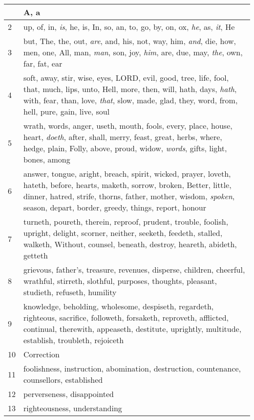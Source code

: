 \begin{center}
\begin{longtable}{l|p{3.75in}}
\hline \hline 
\endlastfoot 
1 & A, a\\ \hline 
2 & up, of, in, \emph{is}, he, is, In, so, an, to, go, by, on, ox, \emph{he}, as, \emph{it}, He\\ \hline 
3 & but, The, the, out, \emph{are}, and, his, not, way, him, \emph{and}, die, how, men, one, All, man, \emph{man}, son, joy, \emph{him}, are, due, may, \emph{the}, own, far, fat, ear\\ \hline 
4 & soft, away, stir, wise, eyes, LORD, evil, good, tree, life, fool, that, much, lips, unto, Hell, more, then, will, hath, days, \emph{hath}, with, fear, than, love, \emph{that}, slow, made, glad, they, word, from, hell, pure, gain, live, soul\\ \hline 
5 & wrath, words, anger, useth, mouth, fools, every, place, house, heart, \emph{doeth}, after, shall, merry, feast, great, herbs, where, hedge, plain, Folly, above, proud, widow, \emph{words}, gifts, light, bones, among\\ \hline 
6 & answer, tongue, aright, breach, spirit, wicked, prayer, loveth, hateth, before, hearts, maketh, sorrow, broken, Better, little, dinner, hatred, strife, thorns, father, mother, wisdom, \emph{spoken}, season, depart, border, greedy, things, report, honour\\ \hline 
7 & turneth, poureth, therein, reproof, prudent, trouble, foolish, upright, delight, scorner, neither, seeketh, feedeth, stalled, walketh, Without, counsel, beneath, destroy, heareth, abideth, getteth\\ \hline 
8 & grievous, father's, treasure, revenues, disperse, children, cheerful, wrathful, stirreth, slothful, purposes, thoughts, pleasant, studieth, refuseth, humility\\ \hline 
9 & knowledge, beholding, wholesome, despiseth, regardeth, righteous, sacrifice, followeth, forsaketh, reproveth, afflicted, continual, therewith, appeaseth, destitute, uprightly, multitude, establish, troubleth, rejoiceth\\ \hline 
10 & Correction\\ \hline 
11 & foolishness, instruction, abomination, destruction, countenance, counsellors, established\\ \hline 
12 & perverseness, disappointed\\ \hline 
13 & righteousness, understanding\\ \hline 
\end{longtable} 
\end{center} 




 
